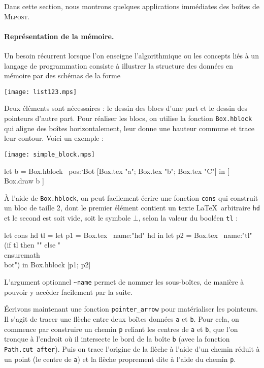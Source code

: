 \documentclass[twoside]{studia-Hermann}
\newcommand{\mlpost}{\textsc{Mlpost}}
\begin{document}
Dans cette section, nous montrons quelques applications immédiates des
boîtes de \mlpost. 

\paragraph{Représentation de la mémoire.}
Un besoin récurrent lorsque l'on enseigne l'algorithmique ou les
concepts liés à un langage de programmation consiste à illustrer
la structure des données en mémoire par des schémas de la forme
\begin{center}
  \texttt{[image: list123.mps]}
\end{center}
Deux éléments sont nécessaires : le dessin des blocs d'une part et le
dessin des pointeurs d'autre part. Pour réaliser les blocs, on utilise
la fonction \texttt{Box.hblock} qui aligne des boîtes horizontalement,
leur donne une hauteur commune et trace leur contour. Voici un exemple
:

\medskip
\begin{minipage}{0.15\linewidth}
  \texttt{[image: simple\_block.mps]}
\end{minipage}
\begin{minipage}{0.8\linewidth}
\small\begin{ocaml}
let b = Box.hblock ~pos:`Bot 
  [Box.tex "a"; Box.tex "b"; Box.tex "C"] in
[ Box.draw b ]
\end{ocaml}
\end{minipage}

\medskip\noindent À l'aide de \texttt{Box.hblock}, on peut facilement
écrire une fonction \texttt{cons} qui construit un bloc de taille 2,
dont le premier élément contient un texte \LaTeX\ arbitraire
\texttt{hd} et le second est soit vide, soit le symbole $\bot$, selon
la valeur du booléen \texttt{tl} :
\begin{ocaml}
let cons hd tl =
  let p1 = Box.tex ~name:"hd" hd in
  let p2 = Box.tex ~name:"tl" 
     (if tl then "" else "\\ensuremath{\\bot}") in
  Box.hblock [p1; p2]
\end{ocaml}
L'argument optionnel \texttt{\~{}name} permet de nommer les
sous-boîtes, de manière à pouvoir y accéder facilement par la suite.

Écrivons maintenant une fonction \texttt{pointer\_arrow} pour
matérialiser les pointeurs. Il s'agit de tracer une flèche entre deux
boîtes données \texttt{a} et \texttt{b}. Pour cela, on commence par
construire un chemin \texttt{p} reliant les centres de \texttt{a} et
\texttt{b}, que l'on tronque à l'endroit où il intersecte le bord de la boîte
\texttt{b} (avec la fonction \texttt{Path.cut\_after}). Puis on trace
l'origine de la flèche à l'aide d'un chemin réduit à un point (le
centre de \texttt{a}) et la flèche proprement dite à l'aide du chemin
\texttt{p}.
\end{document}
